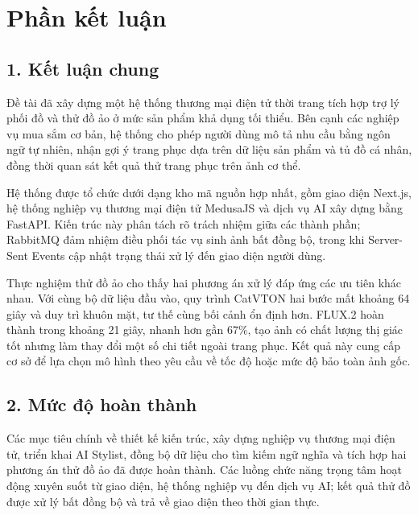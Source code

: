 \chapter*{Phần kết luận}
{}

\section*{1. Kết luận chung}
{}

Đề tài đã xây dựng một hệ thống thương mại điện tử thời trang tích hợp trợ lý phối đồ và thử đồ ảo ở mức sản phẩm khả dụng tối thiểu. Bên cạnh các nghiệp vụ mua sắm cơ bản, hệ thống cho phép người dùng mô tả nhu cầu bằng ngôn ngữ tự nhiên, nhận gợi ý trang phục dựa trên dữ liệu sản phẩm và tủ đồ cá nhân, đồng thời quan sát kết quả thử trang phục trên ảnh cơ thể.

\medskip

Hệ thống được tổ chức dưới dạng kho mã nguồn hợp nhất, gồm giao diện Next.js, hệ thống nghiệp vụ thương mại điện tử MedusaJS và dịch vụ AI xây dựng bằng FastAPI. Kiến trúc này phân tách rõ trách nhiệm giữa các thành phần; RabbitMQ đảm nhiệm điều phối tác vụ sinh ảnh bất đồng bộ, trong khi Server-Sent Events cập nhật trạng thái xử lý đến giao diện người dùng.

\medskip

Thực nghiệm thử đồ ảo cho thấy hai phương án xử lý đáp ứng các ưu tiên khác nhau. Với cùng bộ dữ liệu đầu vào, quy trình CatVTON hai bước mất khoảng 64 giây và duy trì khuôn mặt, tư thế cùng bối cảnh ổn định hơn. FLUX.2 hoàn thành trong khoảng 21 giây, nhanh hơn gần 67\%, tạo ảnh có chất lượng thị giác tốt nhưng làm thay đổi một số chi tiết ngoài trang phục. Kết quả này cung cấp cơ sở để lựa chọn mô hình theo yêu cầu về tốc độ hoặc mức độ bảo toàn ảnh gốc.

\section*{2. Mức độ hoàn thành}
{}

Các mục tiêu chính về thiết kế kiến trúc, xây dựng nghiệp vụ thương mại điện tử, triển khai AI Stylist, đồng bộ dữ liệu cho tìm kiếm ngữ nghĩa và tích hợp hai phương án thử đồ ảo đã được hoàn thành. Các luồng chức năng trọng tâm hoạt động xuyên suốt từ giao diện, hệ thống nghiệp vụ đến dịch vụ AI; kết quả thử đồ được xử lý bất đồng bộ và trả về giao diện theo thời gian thực.

